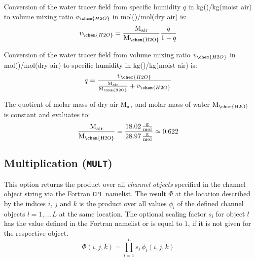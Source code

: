 \documentclass[twoside]{article}
\begin{document}
Conversion of the water tracer field from specific humidity $q$ in kg()/kg(moist air) to volume mixing ratio $v_{\chem{H2O}}$ in mol()/mol(dry air) is:
\begin{equation}
   v_{\chem{H2O}} = \frac{\text{M}_{\text{air}}}{\text{M}_{\text{\chem{H2O}}}} \frac{q}{1 - q}
\end{equation}

Conversion of the water tracer field from volume mixing ratio $v_{\chem{H2O}}$ in mol()/mol(dry air) to specific humidity in kg()/kg(moist air) is:
\begin{equation}
   q = \frac{v_{\chem{H2O}}}{\frac{\text{M}_{\text{air}}}{\text{M}_{\text{\chem{H2O}}}} + v_{\chem{H2O}}}
\end{equation}

The quotient of molar mass of dry air $\text{M}_{\text{air}}$ and molar mass of water $\text{M}_{\text{\chem{H2O}}}$ is constant and evaluates to:
\begin{equation}
   \frac{\text{M}_{\text{air}}}{\text{M}_{\text{\chem{H2O}}}} = \frac{18.02\,\frac{\text{g}}{\text{mol}}}{28.97\,\frac{\text{g}}{\text{mol}}} \approx 0.622
\end{equation}
%
%
\subsection{Multiplication ({\tt MULT})}
\label{sec:multiplication}
This option returns the product over all {\it channel objects} specified in the channel object string via the Fortran {\tt CPL} namelist.
The result $\Phi$ at the location described by the indices $i$, $j$ and $k$ is the product over all values $\phi_l$ of the defined channel objects $l=1,..,L$ at the same location.
The optional scaling factor $s_l$ for object $l$ has the value defined in the Fortran namelist or is equal to $1$, if it is not given for the respective object.
%
\begin{equation}
\Phi(i,j,k) = \prod_{l=1}^Ls_l\,\phi_l(i,j,k)
\end{equation}
%
%
\end{document}
